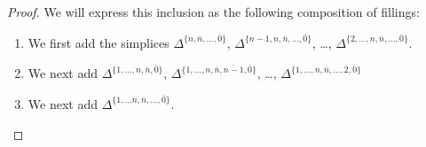 \documentclass[main.tex]{subfiles}
\begin{document}
\begin{proof}
  We will express this inclusion as the following composition of fillings:
  \begin{enumerate}
    \item We first add the simplices $\Delta^{\{n, \overline{n}, \ldots, \overline{0}\}}$, $\Delta^{\{n-1, n, \overline{n}, \ldots, \overline{0}\}}$, \dots, $\Delta^{\{2, \ldots, n, \overline{n}, \ldots, \overline{0}\}}$.

    \item We next add $\Delta^{\{1, \ldots, n, \overline{n}, \overline{0}\}}$, $\Delta^{\{1, \ldots, n, \overline{n}, \overline{n-1}, \overline{0}\}}$, \dots, $\Delta^{\{1, \ldots, n, \overline{n}, \ldots, \overline{2}, \overline{0}\}}$
      
    \item We next add $\Delta^{\{1, \ldots n, \overline{n}, \ldots, \overline{0}\}}$.


\end{enumerate}
\end{proof}
\end{document}
